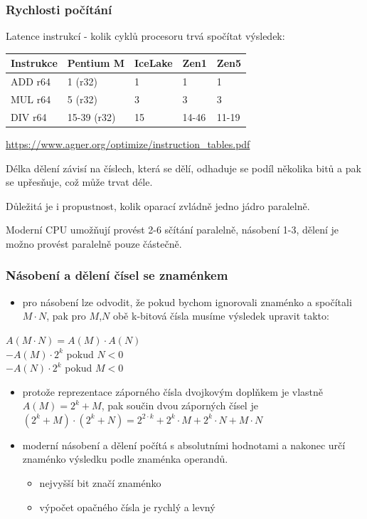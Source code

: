 \documentclass{beamer}
\begin{document}
\begin{frame}
\frametitle{Rychlosti počítání}

Latence instrukcí - kolik cyklů procesoru trvá spočítat výsledek:

\begin{tabular}{l|l|l|l|l}
\textbf{Instrukce} & \textbf{Pentium M} & \textbf{IceLake} & \textbf{Zen1} & \textbf{Zen5}\\
\hline
ADD r64 & 1 (r32) & 1 & 1 & 1 \\ \hline
MUL r64 & 5 (r32)& 3 &  3 & 3\\ \hline
DIV r64 & 15-39 (r32) & 15 & 14-46 & 11-19\\ 
\end{tabular}

\url{https://www.agner.org/optimize/instruction_tables.pdf}


Délka dělení závisí na číslech, která se dělí, odhaduje se podíl několika bitů a pak se upřesňuje, což může trvat déle.

Důležitá je i propustnost, kolik oparací zvládně jedno jádro paralelně. 

Moderní CPU umožňují provést 2-6 sčítání paralelně, násobení 1-3, dělení je možno provést paralelně pouze částečně.

\end{frame}



\begin{frame}
\frametitle{Násobení a dělení čísel se znaménkem}

\begin{itemize}
\item pro násobení lze odvodit, že pokud bychom ignorovali znaménko a spočítali $M\cdot N$, pak pro $M$,$N$ obě k-bitová čísla musíme výsledek upravit takto:
\end{itemize}
$A(M\cdot N) = A(M) \cdot A(N)$\\
\phantom{$A(M\cdot N)$ }$-A(M) \cdot 2^k$ \phantom{xxxxx} pokud $N<0$\\
\phantom{$A(M\cdot N)$ }$-A(N) \cdot 2^k$ \phantom{xxxxx} pokud $M<0$
\begin{itemize}
\item protože reprezentace záporného čísla dvojkovým doplňkem je vlastně $A(M) = 2^k+M$, pak součin dvou záporných čísel je $(2^k+M)\cdot (2^k+N) = 2^{2\cdot k}+2^k \cdot M + 2^k \cdot N + M \cdot N$
\end{itemize}
\begin{itemize}
\item moderní násobení a dělení počítá s absolutními hodnotami a nakonec určí znaménko výsledku podle znaménka operandů.
\begin{itemize}
\item nejvyšší bit značí znaménko
\item výpočet opačného čísla je rychlý a levný
\end{itemize}
\end{itemize}
\end{frame}
\end{document}
